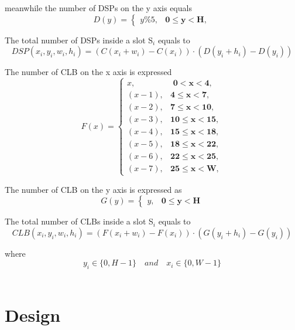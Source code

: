 \documentclass[11pt]{article}
\theoremstyle{definition}
\begin{document}
meanwhile the number of DSPs on the y axis equals 
\begin{equation}
D(y) = \begin{cases} 
y\%5, & \textbf{0$\leq$y$<$H},
\end{cases}
\end{equation}

The total number of DSPs inside a slot S$_i$ equals to \\
\begin{equation}
DSP(x_i,y_i,w_i,h_i) =  (C(x_i+w_i) - C(x_i)) \cdot (D(y_i+h_i) - D(y_i))
\end{equation}					  


The number of CLB on the x axis is expressed 					  
\begin{equation}
F(x) = \begin{cases}
x, & \textbf{ 0$<$x$<$4}, \\
(x-1), & \textbf{4$\leq$x$<$7}, \\
(x-2), & \textbf{7$\leq$x$<$10}, \\
(x-3), & \textbf{10$\leq$x$<$15}, \\
(x-4), & \textbf{15$\leq$x$<$18}, \\
(x-5), & \textbf{18$\leq$x$<$22}, \\
(x-6), & \textbf{22$\leq$x$<$25}, \\
(x-7), & \textbf{25$\leq$x$<$W},
\end{cases}
\end{equation}

The number of CLB on the y axis is expressed as 
\begin{equation}
G(y) =  \begin{cases}
y, & \textbf{0$\leq$y$<$H}
\end{cases}
\end{equation}

The total number of CLBs inside a slot S$_i$ equals to \\
\begin{equation}
CLB(x_i,y_i,w_i,h_i) =  (F(x_i+w_i) - F(x_i)) \cdot (G(y_i+h_i) - G(y_i))
\end{equation}					  
			  
					  
\hspace{15mm} where \[y_i\in \{0, H-1 \}  \quad and \quad x_i\in \{0, W-1 \} \] \\

\section{Design}
\end{document}
